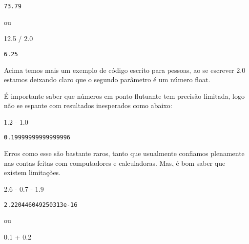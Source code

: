 \documentclass[
  letterpaper,
  DIV=11,
  numbers=noendperiod]{scrreprt}
\newenvironment{Shaded}{\begin{snugshade}}{\end{snugshade}}
\newcommand{\FloatTok}[1]{\textcolor[rgb]{0.68,0.00,0.00}{#1}}
\newcommand{\OperatorTok}[1]{\textcolor[rgb]{0.37,0.37,0.37}{#1}}
\begin{document}
\begin{verbatim}
73.79
\end{verbatim}

ou

\begin{Shaded}
\begin{Highlighting}[]
\FloatTok{12.5} \OperatorTok{/} \FloatTok{2.0}
\end{Highlighting}
\end{Shaded}

\begin{verbatim}
6.25
\end{verbatim}

Acima temos mais um exemplo de código escrito para pessoas, ao se
escrever 2.0 estamos deixando claro que o segundo parâmetro é um número
float.

É importante saber que números em ponto flutuante tem precisão limitada,
logo não se espante com resultados inesperados como abaixo:

\begin{Shaded}
\begin{Highlighting}[]
\FloatTok{1.2} \OperatorTok{{-}} \FloatTok{1.0}
\end{Highlighting}
\end{Shaded}

\begin{verbatim}
0.19999999999999996
\end{verbatim}

Erros como esse são bastante raros, tanto que usualmente confiamos
plenamente nas contas feitas com computadores e calculadoras. Mas, é bom
saber que existem limitações.

\begin{Shaded}
\begin{Highlighting}[]
\FloatTok{2.6} \OperatorTok{{-}} \FloatTok{0.7} \OperatorTok{{-}} \FloatTok{1.9}
\end{Highlighting}
\end{Shaded}

\begin{verbatim}
2.220446049250313e-16
\end{verbatim}

ou

\begin{Shaded}
\begin{Highlighting}[]
\FloatTok{0.1} \OperatorTok{+} \FloatTok{0.2}
\end{Highlighting}
\end{Shaded}
\end{document}
